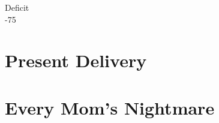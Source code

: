 \documentclass{problem-set}
\begin{document}
{
Deficit \\
-75
}

\newpage
\section{Present Delivery}

\section{Every Mom's Nightmare}
\end{document}
